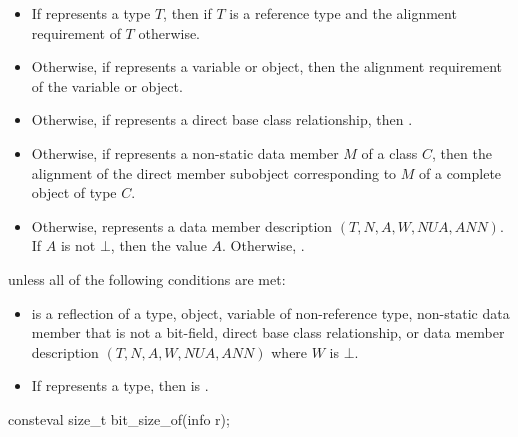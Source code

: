 \begin{itemdescr}
\pnum
\returns
\begin{itemize}
\item
  If  represents a type $T$,
  then  if $T$ is a reference type
  and the alignment requirement of $T$ otherwise.
\item
  Otherwise, if  represents a variable or object,
  then the alignment requirement of the variable or object.
\item
  Otherwise, if  represents a direct base class relationship,
  then .
\item
  Otherwise, if  represents a non-static data member $M$ of a class $C$,
  then the alignment of the direct member subobject
  corresponding to $M$ of a complete object of type $C$.
\item
  Otherwise,  represents a data member description
  $(T, N, A, W, \mathit{NUA}, \mathit{ANN})$.
  If $A$ is not $\bot$,
  then the value $A$.
  Otherwise, .
\end{itemize}

\pnum
\throws
{} unless
all of the following conditions are met:
\begin{itemize}
\item
{} is a reflection of a
type,
object,
variable of non-reference type,
non-static data member that is not a bit-field,
direct base class relationship, or
data member description
$(T, N, A, W, \mathit{NUA}, \mathit{ANN})$
where $W$ is $\bot$.
\item
If  represents a type,
then  is .
\end{itemize}
\end{itemdescr}

%
\begin{itemdecl}
consteval size_t bit_size_of(info r);
\end{itemdecl}

